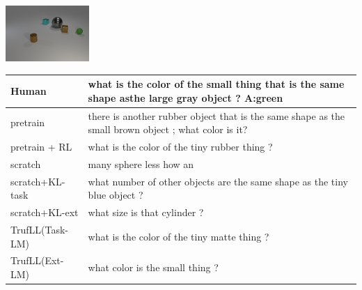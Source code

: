 \documentclass{article}
\newcommand{\algo}{TrufLL\xspace}
\begin{document}
\begin{table}[t!]
  \begin{minipage}{0.2\linewidth}
        \includegraphics[width=120px]{./CLEVR_val_004959.png}
	\end{minipage}
	\hspace{1.2cm}
	\begin{minipage}{0.80\linewidth}
		\scriptsize
		\begin{tabular}{ll}
			Human           & what is the color of the small thing that is the same shape asthe large gray object ? \quad \textbf{A:green} \\
			\midrule
			pretrain        & there is another rubber object that is the same shape as the small brown object ; what color is it?\\
		    pretrain + RL   & what is the color of the tiny rubber thing ? \\ \midrule
			scratch         & many sphere less how an  \\
			scratch+KL-task & what number of other objects are the same shape as the tiny blue object ? \\
			scratch+KL-ext  & what size is that cylinder ?\\ \midrule
			\algo(Task-LM) & what is the color of the tiny matte thing ? \\
			\algo(Ext-LM)   & what color is the small thing ? \\
			\bottomrule
		\end{tabular}
	\end{minipage}
	\vspace{1mm}
	

\end{table}
\end{document}
